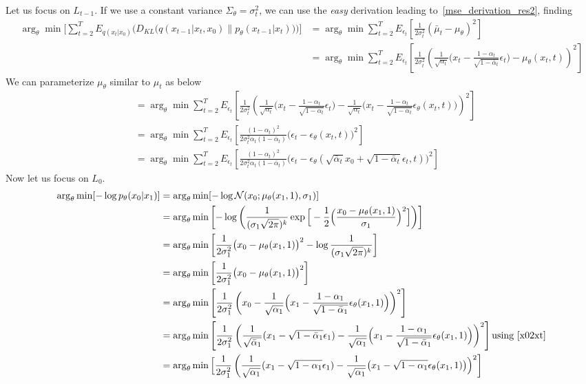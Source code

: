 \documentclass{book}
\numberwithin{equation}{subsection}
\begin{document}
Let us focus on $L_{t-1}$. If we use a constant variance $\Sigma_\theta = \sigma_t^2$, we can use the \textit{easy} derivation leading to~\ref{mse_derivation_res2}, finding
\begin{align}
    \arg_\theta\min\Big[\sum_{t=2}^T E_{q(x_t|x_0)}\Big(D_{KL}\big(q(x_{t-1} |x_t, x_0) \parallel p_\theta(x_{t-1} |x_t)\big)\Big)\Big]
    &= \arg_\theta\min \sum_{t=2}^TE_{\epsilon_t}\left[\frac{1}{2\sigma_t^2}(\bar{\mu}_t-\mu_\theta)^2\right]\\
    &= \arg_\theta\min \sum_{t=2}^TE_{\epsilon_t}\left[\frac{1}{2\sigma_t^2}\left(\frac{1}{\sqrt{\alpha_t}} \Big(x_t - \frac{1 - \alpha_t}{\sqrt{1 - \bar{\alpha}_t}} \epsilon_t \Big)-\mu_\theta(x_t,t)\right)^2\right]
\end{align}
We can parameterize $\mu_\theta$ similar to $\mu_t$ as below
\begin{align}
    &= \arg_\theta\min \sum_{t=2}^TE_{\epsilon_t}\left[\frac{1}{2\sigma_t^2}\left(\frac{1}{\sqrt{\alpha_t}} \Big(x_t - \frac{1 - \alpha_t}{\sqrt{1 - \bar{\alpha}_t}} \epsilon_t \Big)-\frac{1}{\sqrt{\alpha_t}} \Big(x_t - \frac{1 - \alpha_t}{\sqrt{1 - \bar{\alpha}_t}} \epsilon_\theta(x_t,t) \Big)\right)^2\right]\\
    &= \arg_\theta\min \sum_{t=2}^TE_{\epsilon_t}\left[\frac{(1-\alpha_t)^2}{2\sigma_t^2\alpha_t(1 - \bar{\alpha}_t)}\big(\epsilon_t-\epsilon_\theta(x_t,t) \big)^2\right]\\
    &= \arg_\theta\min \sum_{t=2}^TE_{\epsilon_t}\left[\frac{(1-\alpha_t)^2}{2\sigma_t^2\alpha_t(1 - \bar{\alpha}_t)}\Big(\epsilon_t-\epsilon_\theta(\sqrt{\bar{\alpha}_t}x_0 + \sqrt{1 - \bar{\alpha}_t}\epsilon_t,t) \Big)^2\right]
\end{align}
Now let us focus on $L_0$.
\begin{align}
    \arg_\theta\min[-\log p_\theta(x_0 |x_1)]
    &= \arg_\theta\min[-\log \mathcal{N}(x_0; \mu_\theta(x_1, 1), \sigma_1)]\\
    &= \arg_\theta\min\left[-\log \left(\frac {1}{(\sigma_1\sqrt{2\pi})^k} \exp\Big[-{\frac {1}{2}}\Big(\frac {x_0-\mu_\theta(x_1, 1)}{\sigma_1}\Big)^2\Big]\right)\right]\\
    &= \arg_\theta\min\left[{\frac {1}{2\sigma_1^2}}\big(x_0-\mu_\theta(x_1, 1)\big)^2-\log \frac {1}{(\sigma_1\sqrt{2\pi})^k}\right]\\
    &= \arg_\theta\min\left[{\frac {1}{2\sigma_1^2}}\big(x_0-\mu_\theta(x_1, 1)\big)^2\right]\\
    &= \arg_\theta\min\left[{\frac {1}{2\sigma_1^2}}\left(x_0-\frac{1}{\sqrt{\alpha_1}} \Big(x_1 - \frac{1 - \alpha_1}{\sqrt{1 - \bar{\alpha}_1}} \epsilon_\theta(x_1,1) \Big)\right)^2\right]\\
    &= \arg_\theta\min\left[{\frac {1}{2\sigma_1^2}}\left(\frac{1}{\sqrt{\bar{\alpha}_1}}(x_1 - \sqrt{1 - \bar{\alpha}_1}\epsilon_1)-\frac{1}{\sqrt{\alpha_1}} \Big(x_1 - \frac{1 - \alpha_1}{\sqrt{1 - \bar{\alpha}_1}} \epsilon_\theta(x_1,1) \Big)\right)^2\right]\text{using~\ref{x02xt}}\\
    &= \arg_\theta\min\Big[{\frac {1}{2\sigma_1^2}}\left(\frac{1}{\sqrt{\alpha_1}}(x_1 - \sqrt{1 - \alpha_1}\epsilon_1)-\frac{1}{\sqrt{\alpha_1}} \big(x_1 - \sqrt{1 - \alpha_1} \epsilon_\theta(x_1,1) \big)\Big)^2\right]
\end{align}
\end{document}
